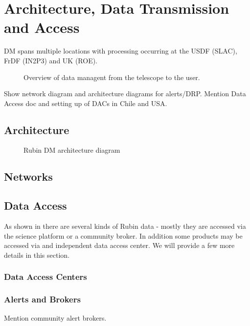 \section {Architecture, Data Transmission and  Access } \label{sec:arch}
DM spans multiple locations with processing occurring at the USDF (SLAC), FrDF (IN2P3) and UK (ROE).
\begin{figure}
\caption{Overview of data managent from the telescope to the user. \label{fig:vision}}
\end{figure}

Show network diagram and architecture diagrams for alerts/DRP. Mention Data Access doc  \cite{RDO-013} and
setting up of DACs in Chile and USA.

\subsection{Architecture}

\begin{figure}
\caption{Rubin DM architecture diagram \cite{LDM-148}\label{fig:arch}}
\end{figure}

\subsection{Networks} \label{sec:network}

\subsection{Data Access} \label{sec:dataaccess}

As shown in  there are several kinds of Rubin data - mostly they are accessed via
the science platform or a community broker.
In addition some products may be accessed via and independent data access center. We will provide a few more details in this section.

\subsubsection{Data Access Centers}

\subsubsection{Alerts and Brokers}
Mention community alert brokers.
